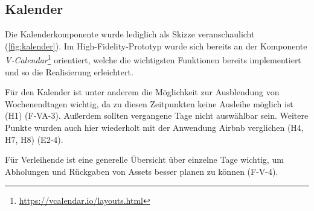 \subsection{Kalender}
Die Kalenderkomponente wurde lediglich als Skizze veranschaulicht
(\ref{fig:kalender}). Im High-Fidelity-Prototyp wurde sich bereits an der
Komponente
\textit{V-Calendar}\footnote{\url{https://vcalendar.io/layouts.html}}
orientiert, welche die wichtigsten Funktionen bereits implementiert und so die Realisierung
erleichtert.

Für den Kalender ist unter anderem die Möglichkeit zur Ausblendung von
Wochenendtagen wichtig, da zu diesen Zeitpunkten keine Ausleihe möglich ist (H1)
(F-VA-3). Außerdem sollten vergangene Tage nicht auswählbar sein. Weitere Punkte
wurden auch hier wiederholt mit der Anwendung Airbnb verglichen (H4, H7, H8) (E2-4).

Für Verleihende ist eine generelle Übersicht über einzelne Tage wichtig, um
Abholungen und Rückgaben von Assets besser planen zu können (F-V-4).

